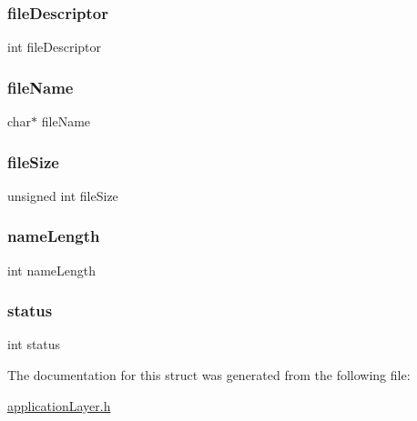 \subsubsection{\texorpdfstring{file\+Descriptor}{fileDescriptor}}
{\footnotesize\ttfamily int file\+Descriptor}

\hypertarget{struct_application_layer_a25c8761bc1f523fe6a53db546ae83add}{}\label{struct_application_layer_a25c8761bc1f523fe6a53db546ae83add} 
\subsubsection{\texorpdfstring{file\+Name}{fileName}}
{\footnotesize\ttfamily char$\ast$ file\+Name}

\hypertarget{struct_application_layer_a02f75786092d1cb5e26302ec679ac5d8}{}\label{struct_application_layer_a02f75786092d1cb5e26302ec679ac5d8} 
\subsubsection{\texorpdfstring{file\+Size}{fileSize}}
{\footnotesize\ttfamily unsigned int file\+Size}

\hypertarget{struct_application_layer_a7989274348ad7f470b7b916df6d8b912}{}\label{struct_application_layer_a7989274348ad7f470b7b916df6d8b912} 
\subsubsection{\texorpdfstring{name\+Length}{nameLength}}
{\footnotesize\ttfamily int name\+Length}

\hypertarget{struct_application_layer_a6e27f49150e9a14580fb313cc2777e00}{}\label{struct_application_layer_a6e27f49150e9a14580fb313cc2777e00} 
\subsubsection{\texorpdfstring{status}{status}}
{\footnotesize\ttfamily int status}



The documentation for this struct was generated from the following file\+:\begin{DoxyCompactItemize}
\item 
\hyperlink{application_layer_8h}{application\+Layer.\+h}\end{DoxyCompactItemize}
